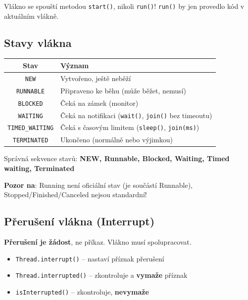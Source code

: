 \documentclass[11pt,a4paper]{article}
\begin{document}
\begin{tcolorbox}[warnbox,title=Důležité!]
Vlákno se spouští metodou \texttt{start()}, nikoli \texttt{run()}! \texttt{run()} by jen provedlo kód v aktuálním vlákně.
\end{tcolorbox}

\subsection{Stavy vlákna}

\begin{center}
\begin{tabular}{cl}
\toprule
\textbf{Stav} & \textbf{Význam} \\
\midrule
\texttt{NEW} & Vytvořeno, ještě neběží \\
\texttt{RUNNABLE} & Připraveno ke běhu (může běžet, nemusí) \\
\texttt{BLOCKED} & Čeká na zámek (monitor) \\
\texttt{WAITING} & Čeká na notifikaci (\texttt{wait()}, \texttt{join()} bez timeoutu) \\
\texttt{TIMED\_WAITING} & Čeká s časovým limitem (\texttt{sleep()}, \texttt{join(ms)}) \\
\texttt{TERMINATED} & Ukončeno (normálně nebo výjimkou) \\
\bottomrule
\end{tabular}
\end{center}

\begin{tcolorbox}[warnbox,title=Otázka ze vzorového testu!]
Správná sekvence stavů: \textbf{NEW, Runnable, Blocked, Waiting, Timed waiting, Terminated}

\textbf{Pozor na}: Running není oficiální stav (je součástí Runnable), Stopped/Finished/Canceled nejsou standardní!
\end{tcolorbox}

\subsection{Přerušení vlákna (Interrupt)}

\begin{tcolorbox}[defbox,title=Mechanismus interrupt]
\textbf{Přerušení je žádost}, ne příkaz. Vlákno musí spolupracovat.
\begin{itemize}
    \item \texttt{Thread.interrupt()} -- nastaví příznak přerušení
    \item \texttt{Thread.interrupted()} -- zkontroluje a \textbf{vymaže} příznak
    \item \texttt{isInterrupted()} -- zkontroluje, \textbf{nevymaže}
\end{itemize}
\end{tcolorbox}
\end{document}
